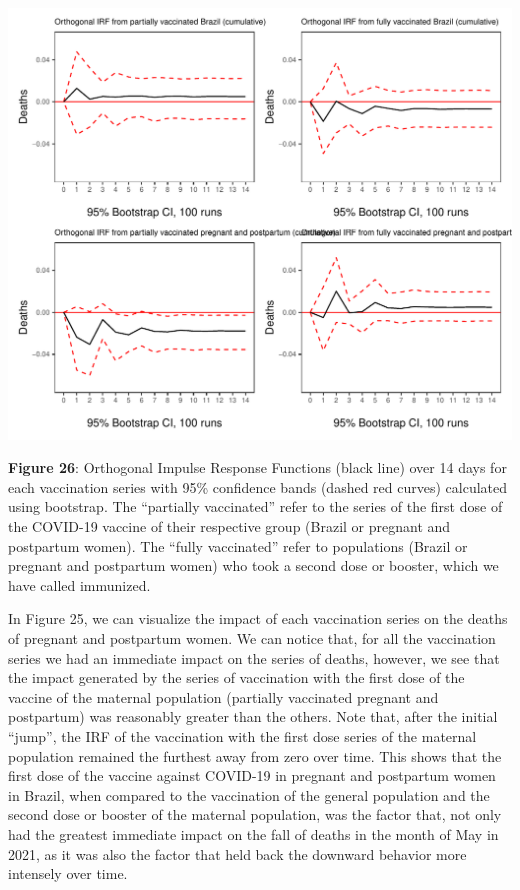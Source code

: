 \documentclass[
]{article}
\begin{document}
\begin{center}\includegraphics[width=\linewidth]{IF_results_ENG_files/figure-latex/unnamed-chunk-40-1} \end{center}

\textbf{Figure 26}: Orthogonal Impulse Response Functions (black line)
over 14 days for each vaccination series with 95\% confidence bands
(dashed red curves) calculated using bootstrap. The ``partially
vaccinated'' refer to the series of the first dose of the COVID-19
vaccine of their respective group (Brazil or pregnant and postpartum
women). The ``fully vaccinated'' refer to populations (Brazil or
pregnant and postpartum women) who took a second dose or booster, which
we have called immunized.

In Figure 25, we can visualize the impact of each vaccination series on
the deaths of pregnant and postpartum women. We can notice that, for all
the vaccination series we had an immediate impact on the series of
deaths, however, we see that the impact generated by the series of
vaccination with the first dose of the vaccine of the maternal
population (partially vaccinated pregnant and postpartum) was reasonably
greater than the others. Note that, after the initial ``jump'', the IRF
of the vaccination with the first dose series of the maternal population
remained the furthest away from zero over time. This shows that the
first dose of the vaccine against COVID-19 in pregnant and postpartum
women in Brazil, when compared to the vaccination of the general
population and the second dose or booster of the maternal population,
was the factor that, not only had the greatest immediate impact on the
fall of deaths in the month of May in 2021, as it was also the factor
that held back the downward behavior more intensely over time.
\end{document}
